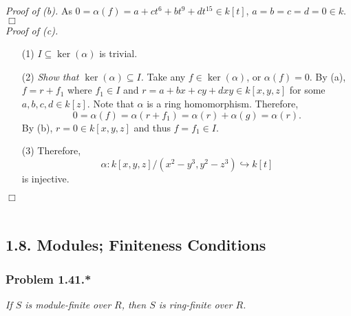 \documentclass{article}
\begin{document}
\emph{Proof of (b).}
  As $0 = \alpha(f) = a + ct^6 + bt^9 + dt^{15} \in k[t]$,
  $a = b = c = d = 0 \in k$.
$\Box$ \\



\emph{Proof of (c).}
\begin{enumerate}
\item[(1)]
  $I \subseteq \ker(\alpha)$ is trivial.

\item[(2)]
  \emph{Show that $\ker(\alpha) \subseteq I$.}
  Take any $f \in \ker(\alpha)$, or $\alpha(f) = 0$.
  By (a), $f = r + f_1$ where $f_1 \in I$ and $r = a + bx + cy + dxy \in k[x,y,z]$
  for some $a, b, c, d \in k[z]$.
  Note that $\alpha$ is a ring homomorphism.
  Therefore,
  \[
    0 = \alpha(f) = \alpha(r + f_1) = \alpha(r) + \alpha(g) = \alpha(r).
  \]
  By (b), $r = 0 \in k[x,y,z]$ and thus $f = f_1 \in I$.

\item[(3)]
  Therefore,
  \[
    \alpha: k[x,y,z]/(x^2-y^3, y^2-z^3) \hookrightarrow k[t]
  \]
  is injective.
\end{enumerate}
$\Box$ \\\\






\subsection*{1.8. Modules; Finiteness Conditions \\}



\subsubsection*{Problem 1.41.*}
\emph{If $S$ is module-finite over $R$, then $S$ is ring-finite over $R$.} \\
\end{document}
